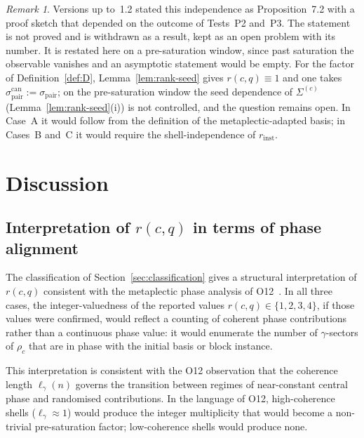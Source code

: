 \documentclass[11pt,a4paper]{article}
\theoremstyle{remark}
\newtheorem{remark}[theorem]{Remark}
\newcommand{\sigmapair}{\sigma_{\mathrm{pair}}}
\newcommand{\sigmacan}{\sigma_{\mathrm{pair}}^{\mathrm{can}}}
\newcommand{\rcq}{r(c,q)}
\newcommand{\ellgam}{\ell_{\gamma}}
\begin{document}
    \begin{remark}
      Versions up to~1.2 stated this independence as Proposition~7.2 with a proof sketch that
      depended on the outcome of Tests~P2 and~P3.
      The statement is not proved and is withdrawn as a result, kept as an open problem with its
      number.
      It is restated here on a pre-saturation window, since past saturation the observable vanishes
      and an asymptotic statement would be empty.
      For the factor of Definition~\ref{def:D}, Lemma~\ref{lem:rank-seed} gives $\rcq \equiv 1$ and
      one takes $\sigmacan := \sigmapair$; on the pre-saturation window the seed dependence of
      $\Sigma^{(c)}$ (Lemma~\ref{lem:rank-seed}(i)) is not controlled, and the question remains open.
      In Case~A it would follow from the definition of the metaplectic-adapted basis; in
      Cases~B and~C it would require the shell-independence of $r_{\mathrm{inst}}$.
    \end{remark}

  \section{Discussion}
  \label{sec:discussion}

  \subsection{Interpretation of $r(c,q)$ in terms of phase alignment}

    The classification of Section~\ref{sec:classification} gives a structural
    interpretation of $\rcq$ consistent with the metaplectic phase analysis
    of O12~\cite{Beau2026a16}.
    In all three cases, the integer-valuedness of the reported values $\rcq \in \{1,2,3,4\}$,
    if those values were confirmed, would reflect a counting of coherent phase contributions rather than a continuous
    phase value: it would enumerate the number of $\gamma$-sectors of $\rho_{c}$
    that are in phase with the initial basis or block instance.

    This interpretation is consistent with the O12 observation that the
    coherence length $\ellgam(n)$ governs the transition between regimes of
    near-constant central phase and randomised contributions.
    In the language of O12, high-coherence shells ($\ellgam \approx 1$) would produce
    the integer multiplicity that would become a non-trivial pre-saturation factor;
    low-coherence shells would produce none.
\end{document}
